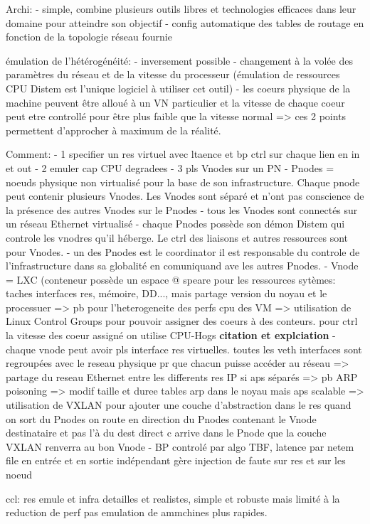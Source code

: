 Archi:
- simple, combine plusieurs outils libres et technologies efficaces dans leur domaine pour atteindre son objectif
- config automatique des tables de routage en fonction de la topologie réseau fournie

émulation de l'hétérogénéité:
- inversement possible
- changement à la volée des paramètres du réseau et de la vitesse du processeur (émulation de ressources CPU Distem est l'unique logiciel à utiliser cet outil)
- les coeurs physique de la machine peuvent  être alloué à un VN particulier et la vitesse de chaque coeur peut etre controllé pour être plus faible que la vitesse normal
=> ces 2 points permettent d'approcher à maximum de la réalité.

Comment:
- 1 specifier un res virtuel avec ltaence et bp ctrl sur chaque lien en in et out
- 2 emuler cap CPU degradees
- 3 pls Vnodes sur un PN
- Pnodes = noeuds physique non virtualisé pour la base de son infrastructure. Chaque pnode peut contenir plusieurs Vnodes. Les Vnodes sont séparé et n'ont pas conscience de la présence des autres Vnodes sur le Pnodes
- tous les Vnodes sont connectés sur un réseau Ethernet virtualisé
- chaque Pnodes possède son démon Distem qui controle les vnodres qu'il héberge. Le ctrl des liaisons et autres ressources sont pour Vnodes.
- un des Pnodes est le coordinator il est responsable du controle de l'infrastructure dans sa globalité en comuniquand ave les autres Pnodes.
- Vnode = LXC (conteneur possède un espace @ speare pour les ressources sytèmes: taches interfaces res, mémoire, DD..., mais partage version du noyau et le processuer => pb pour l'heterogeneite des perfs cpu des VM => utilisation de Linux Control Groups pour pouvoir assigner des coeurs à des conteurs. pour ctrl la vitesse des coeur assigné on utilise CPU-Hogs \textbf{citation et explciation}
- chaque vnode peut avoir pls interface res virtuelles. toutes les veth interfaces sont regroupées avec le reseau physique pr que chacun puisse accéder au réseau => partage du reseau Ethernet entre les differents res IP si aps séparés => pb ARP poisoning => modif taille et duree tables arp dans le noyau mais aps scalable => utilisation de VXLAN pour ajouter une couche d'abstraction dans le res quand on sort du Pnodes on route en direction du Pnodes contenant le Vnode destinataire et pas l'à du dest direct c arrive dans le Pnode que la couche VXLAN renverra au bon Vnode
- BP controlé par algo TBF, latence par netem file en entrée et en sortie indépendant
gère injection de faute sur res et sur les noeud

ccl:
res emule et infra detailles et realistes, simple et robuste mais limité à la reduction de perf pas emulation de ammchines plus rapides.
